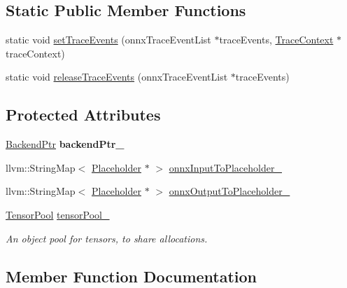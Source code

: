 \subsection*{Static Public Member Functions}
\begin{DoxyCompactItemize}
\item 
static void \hyperlink{classglow_1_1onnxifi_1_1_graph_ac767c69072721e62c27aaa443d9f0e60}{set\+Trace\+Events} (onnx\+Trace\+Event\+List $\ast$trace\+Events, \hyperlink{classglow_1_1_trace_context}{Trace\+Context} $\ast$trace\+Context)
\item 
static void \hyperlink{classglow_1_1onnxifi_1_1_graph_a8fcbaaff1388becad2a7e3a1ee1a3439}{release\+Trace\+Events} (onnx\+Trace\+Event\+List $\ast$trace\+Events)
\end{DoxyCompactItemize}
\subsection*{Protected Attributes}
\begin{DoxyCompactItemize}
\item 
\mbox{\label{classglow_1_1onnxifi_1_1_graph_af0c5bd4d946858e8be3316dff24d3ec9}} 
\hyperlink{classglow_1_1onnxifi_1_1_backend}{Backend\+Ptr} {\bfseries backend\+Ptr\+\_\+}
\item 
llvm\+::\+String\+Map$<$ \hyperlink{classglow_1_1_placeholder}{Placeholder} $\ast$ $>$ \hyperlink{classglow_1_1onnxifi_1_1_graph_ab96d99570b4e9549fba9670b479223e6}{onnx\+Input\+To\+Placeholder\+\_\+}
\item 
llvm\+::\+String\+Map$<$ \hyperlink{classglow_1_1_placeholder}{Placeholder} $\ast$ $>$ \hyperlink{classglow_1_1onnxifi_1_1_graph_a624dc38c4ec10e3314425eb8155114b8}{onnx\+Output\+To\+Placeholder\+\_\+}
\item 
\mbox{\label{classglow_1_1onnxifi_1_1_graph_a4ce599126cc4eb83d5d97d145913d4fd}} 
\hyperlink{classglow_1_1_tensor_pool}{Tensor\+Pool} \hyperlink{classglow_1_1onnxifi_1_1_graph_a4ce599126cc4eb83d5d97d145913d4fd}{tensor\+Pool\+\_\+}
\begin{DoxyCompactList}\small\item\em An object pool for tensors, to share allocations. \end{DoxyCompactList}\end{DoxyCompactItemize}


\subsection{Member Function Documentation}
\mbox{\label{classglow_1_1onnxifi_1_1_graph_a5f1ec69446852a2515d8aeec487a521a}} 
